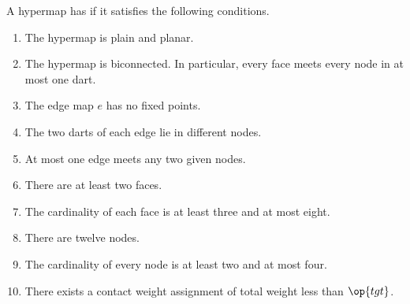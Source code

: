 \begin{definition}
  A hypermap has  if it satisfies the following
  conditions.
%
%
%
%
%
%
%
%
%
\begin{enumerate}
\item {} The hypermap is plain and planar.
\item {} The hypermap is biconnected.  In particular,
  every face meets every node in at most one dart.
\item {} The edge map $e$ has no fixed points.
\item {} The two darts of each edge lie in different
  nodes.
\item {} At most one edge meets any two given
  nodes.
\item {} There are at least two faces.
\item {} The cardinality of each face is at least three
  and at most eight.
\item {} There are twelve nodes.
\item {} The cardinality of every node is at least two  and at most four.
\item {} There exists a contact weight assignment of total
  weight less than $\op{tgt}$.
\end{enumerate}
%
\end{definition}


